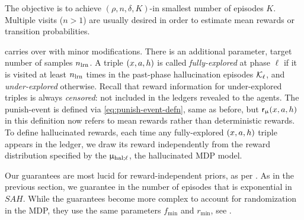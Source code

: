 \noindent The objective is to achieve $(\rho,n,\delta,K)$-\traversal in smallest number of episodes $K$. Multiple visits ($n>1$) are usually desired in order to estimate mean rewards or transition probabilities.

  carries over with minor modifications. There is an additional parameter, target number of samples $n_{\mathrm{lrn}}$. A triple $(x,a,h)$ is called \emph{fully-explored} at phase $\ell$  if it is visited at least $n_{\mathrm{lrn}}$ times in the past-phase hallucination episodes $\mathcal{K}_{\ell}$, and \emph{under-explored} otherwise. Recall that reward information for under-explored triples is always \emph{censored}: not included in the ledgers revealed to the agents. The punish-event is defined via \eqref{eq:punish-event-defn}, same as before, but $\mathsf{r}_{\upmu}(x,a,h)$ in this definition now refers to mean rewards rather than deterministic rewards. To define hallucinated rewards, each time any fully-explored $(x,a,h)$ triple appears in the ledger, we draw its reward independently from the reward distribution specified by the $\upmu_{\mathrm{hal};\ell}$, the hallucinated MDP model.

Our guarantees are most lucid for reward-independent priors, as per . As in the previous section, we guarantee \traversal in the number of episodes that is exponential in $SAH$. While the guarantees become more complex to account for randomization in the MDP, they use the same parameters $f_{\min}$ and $r_{\min}$, see .

